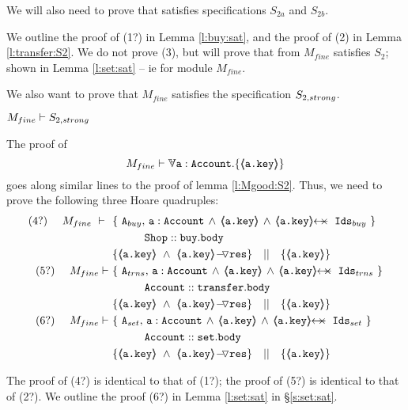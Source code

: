 \begin{proofO}
We will also need to prove that  satisfies specifications $S_{2a}$ and $S_{2b}$. 


We outline the proof of (1?) in Lemma \ref{l:buy:sat},%
and the proof of (2) in Lemma \ref{l:transfer:S2}.
We do not prove (3), but will prove that  from $M_{fine}$
satisfies $S_2$; shown in  Lemma \ref{l:set:sat} -- ie for module $M_{fine}$.

\end{proofO}

We also want to prove that $M_{fine}$ satisfies the specification $S_{2,strong}$.

\begin{lemma} 
\label{l:Mfine:S2}

$M_{fine} \vdash S_{2,strong}$
\end{lemma}
\begin{proofO}
The proof of
$$M_{fine} \vdash \TwoStatesN {\prg{a}:\prg{Account}}  {\inside{\prg{\prg{a.key}}}}$$
goes along similar lines to the proof of lemma \ref{l:Mgood:S2}.
Thus, we need to prove the following  three Hoare quadruples: 
 \small
\begin{align*}
\text{(4?)}  \ \ \ \ M_{fine}\ \vdash  \  \ 
		&	\{  \ \Alocals, \, \prg{a}:\prg{Account} \, \wedge\, {\inside{\prg{a.key}}} \, \wedge \, \protectedFrom {\prg{a.key}} {\Ids}  \  \} \\
		& \SPT \prg{Shop}::\prg{buy}.\prg{body}\ \\  
		& \{ {\inside{\prg{a.key}}}\ \wedge\ {\PushASLong {\prg{res}} {\inside{\prg{a.key}}}}  \} \ \ \  || \ \ \ 
		   \{ {\inside{\prg{a.key}}} \}
\\
\text{(5?)}  \ \ \ \ M_{fine} \vdash \ 
		&	\{  \ \Alocalstr, \, \prg{a}:\prg{Account}\, \wedge\,  {\inside{\prg{a.key}}} \, \wedge \, \protectedFrom {\prg{a.key}} {\Idstr}  \  \} \\
		& \SPT \prg{Account}::\prg{transfer}.\prg{body}\ \\  
		& \{ {\inside{\prg{a.key}}}\ \wedge\ {\PushASLong {\prg{res}} {\inside{\prg{a.key}}}}  \} \ \ \  || \ \ \ 
		   \{ {\inside{\prg{a.key}}} \}
\\
\text{(6?)}  \ \ \ \ M_{fine} \vdash \ 
		&	\{  \ \Alocalsset, \, \prg{a}:\prg{Account}\, \wedge\,  {\inside{\prg{a.key}}} \, \wedge \, \protectedFrom {\prg{a.key}} {\Idsset}  \  \} \\
		& \SPT \prg{Account}::\prg{set}.\prg{body}\ \\  
		& \{ {\inside{\prg{a.key}}}\ \wedge\ {\PushASLong {\prg{res}} {\inside{\prg{a.key}}}}  \} \ \ \  || \ \ \ 
		   \{ {\inside{\prg{a.key}}} \}
\end{align*}

 
\normalsize

The proof of (4?) is identical to that of (1?); the proof of (5?) is identical to that of (2?). 
We outline the proof (6?)    in Lemma \ref{l:set:sat} in \S \ref{s:set:sat}.

\end{proofO}



